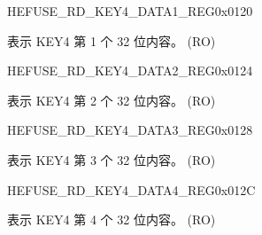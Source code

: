 \begin{register}{H}{EFUSE\_RD\_KEY4\_DATA1\_REG}{0x{}0120}\label{regdesc:EFUSERDKEY4DATA1REG}
%
\regnewline%
\begin{regdesc}\begin{reglist}
\label{fielddesc:EFUSEKEY4DATA1}\item [EFUSE\_KEY4\_DATA1] 表示 KEY4 第 1 个 32 位内容。 (RO)
\end{reglist}\end{regdesc}
\end{register}


\begin{register}{H}{EFUSE\_RD\_KEY4\_DATA2\_REG}{0x{}0124}\label{regdesc:EFUSERDKEY4DATA2REG}
%
\regnewline%
\begin{regdesc}\begin{reglist}
\label{fielddesc:EFUSEKEY4DATA2}\item [EFUSE\_KEY4\_DATA2] 表示 KEY4 第 2 个 32 位内容。 (RO)
\end{reglist}\end{regdesc}
\end{register}


\begin{register}{H}{EFUSE\_RD\_KEY4\_DATA3\_REG}{0x{}0128}\label{regdesc:EFUSERDKEY4DATA3REG}
%
\regnewline%
\begin{regdesc}\begin{reglist}
\label{fielddesc:EFUSEKEY4DATA3}\item [EFUSE\_KEY4\_DATA3] 表示 KEY4 第 3 个 32 位内容。 (RO)
\end{reglist}\end{regdesc}
\end{register}


\begin{register}{H}{EFUSE\_RD\_KEY4\_DATA4\_REG}{0x{}012C}\label{regdesc:EFUSERDKEY4DATA4REG}
%
\regnewline%
\begin{regdesc}\begin{reglist}
\label{fielddesc:EFUSEKEY4DATA4}\item [EFUSE\_KEY4\_DATA4] 表示 KEY4 第 4 个 32 位内容。 (RO)
\end{reglist}\end{regdesc}
\end{register}


